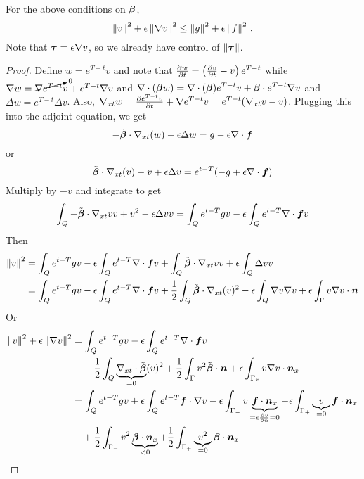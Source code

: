 \documentclass{article}
\begin{document}
\begin{lemma}
\label{lem:l2}
For the above conditions on $\boldsymbol\beta$,
\[
\left\| v \right\|^2+\epsilon\left\| \nabla v \right\|^2\leq\left\| g \right\|^2+\epsilon\left\| f \right\|^2\,.
\]
Note that $\boldsymbol\tau=\epsilon\nabla v$, so we already have control of $\left\| \boldsymbol\tau \right\|$.
\end{lemma}
\begin{proof}
Define $w=e^{T-t}v$ and note that $\frac{\partial w}{\partial t}=\left( \frac{\partial v}{\partial t}-v \right)e^{T-t}$ while $\nabla w=\cancelto{0}{\nabla e^{T-t}} v+e^{T-t}\nabla v$ and
$\nabla\cdot(\boldsymbol\beta w)=\nabla\cdot(\boldsymbol\beta)e^{T-t} v+\boldsymbol\beta\cdot e^{T-t}\nabla v$ and $\Delta w=e^{T-t}\Delta v$. 
Also, $\nabla_{xt} w=\frac{\partial e^{T-t} v}{\partial t}+\nabla{e^{T-t} v}=e^{T-t}(\nabla_{xt} v-v)$.
Plugging this into the adjoint equation, we get
\begin{equation*}
-\tilde{\boldsymbol\beta}\cdot\nabla_{xt}(w)-\epsilon\Delta w=g-\epsilon\nabla\cdot\boldsymbol f
\end{equation*}
or 
\begin{equation*}
\tilde{\boldsymbol\beta}\cdot\nabla_{xt}(v)-v+\epsilon\Delta v=e^{t-T}(-g+\epsilon\nabla\cdot\boldsymbol f)
\end{equation*}
Multiply by $-v$ and integrate to get
\begin{align*}
\int_Q-\tilde{\boldsymbol\beta}\cdot\nabla_{xt} vv+v^2-\epsilon\Delta vv=\int_Qe^{t-T}gv-\epsilon\int_Qe^{t-T}\nabla\cdot\boldsymbol f v
\end{align*}
Then
\begin{align*}
\norm{v}^2&=\int_Qe^{t-T}gv
-\epsilon\int_Qe^{t-T}\Div\bff v
+\int_Q\tilde\bfbeta\cdot\Gradxt vv
+\epsilon\int_Q\Delta vv\\
%
&=\int_Qe^{t-T}gv
-\epsilon\int_Qe^{t-T}\Div\bff v
+\frac{1}{2}\int_Q\tilde\bfbeta\cdot\Gradxt(v)^2
-\epsilon\int_Q\Grad v\Grad v
+\epsilon\int_\Gamma v\Grad v\cdot\bfn
\\
\end{align*}
Or
\begin{align*}
\norm{v}^2+\epsilon\norm{\Grad v}^2&=\int_Qe^{t-T}gv
-\epsilon\int_Qe^{t-T}\Div\bff v\\
&\quad-\frac{1}{2}\int_Q\underbrace{\Divxt\tilde\bfbeta}_{=0}(v)^2
+\frac{1}{2}\int_\Gamma v^2\tilde\bfbeta\cdot\bfn
+\epsilon\int_{\Gamma_x} v\Grad v\cdot\bfn_x
\\
&=\int_Qe^{t-T}gv
+\epsilon\int_Qe^{t-T}\bff\cdot\Grad v
-\epsilon\int_{\Gamma_-}v\underbrace{\bff\cdot\bfn_x}_{=\epsilon\pd{v}{n}=0}
-\epsilon\int_{\Gamma_+}\underbrace{v}_{=0}\bff\cdot\bfn_x\\
&\quad+\frac{1}{2}\int_{\Gamma_-} v^2\underbrace{\bfbeta\cdot\bfn_x}_{<0}
+\frac{1}{2}\int_{\Gamma_+} \underbrace{v^2}_{=0}\bfbeta\cdot\bfn_x\\

\end{align*}
\end{proof}
\end{document}

